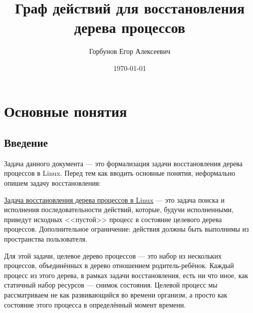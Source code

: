 

\title{Граф действий для восстановления дерева процессов}
\author{Горбунов Егор Алексеевич}
\date{\today}

\newcommand{\crcreate}[3]{\text{\textit{CreateAction}}(#1, #2, #3)}
\newcommand{\crshare}[4]{\text{\textit{ShareAction}}(#1, #2, #3, #4)}
\newcommand{\crinher}[2]{\text{\textit{InheritProperty}}(#1, #2)}
\newcommand{\crdependenices}[1]{\text{\textit{resourceDependencies}}(#1)}
\newcommand{\crremove}[3]{\text{\textit{RemoveAction}}(#1, #2, #3)}
\newcommand{\crfork}[3]{\text{\textit{ForkAction}}(#1, #2, #3)}
\newcommand{\isinherited}[1]{\text{\textit{isInherited}}(#1)}
\newcommand{\issharable}[1]{\text{\textit{isSharable}}(#1)}
\newcommand{\possibleCreators}[2]{\text{\textit{possibleCreators}}(#1, #2)}
\newcommand{\canExistAtOnce}[2]{\text{\textit{canExistAtOnce}}(#1, #2)}
\newcommand{\resourceHolders}[2]{\text{\textit{resourceHolders}}(#1, #2)}




\maketitle

\section{Основные понятия}

\subsection{Введение}

Задача данного документа --- это формализация задачи восстановления дерева процессов в Linux. Перед тем как вводить основные понятия, неформально опишем задачу восстановления:

\underline{Задача восстановления дерева процессов в Linux} --- это задача поиска и исполнения последовательности действий, которые, будучи исполненными, приведут исходных <<пустой>> процесс в состояние целевого дерева процессов. Дополнительное ограничение: действия должны быть выполнимы из пространства пользователя.

Для этой задачи, целевое дерево процессов --- это набор из нескольких процессов, объединённых в дерево отношением родитель-ребёнок. Каждый процесс из этого дерева, в рамках задачи восстановления, есть ни что иное, как статичный набор ресурсов --- снимок состояния. Целевой процесс мы рассматриваем не как развивающийся во времени организм, а просто как состояние этого процесса в определённый момент времени.

